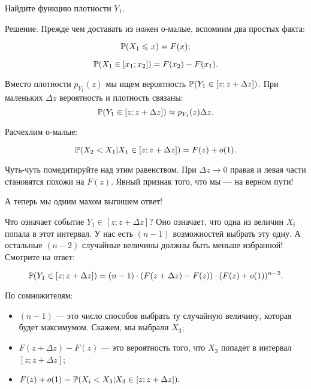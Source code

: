 \begin{myex} Найдите функцию плотности $ Y_{1} $.

Решение. Прежде чем доставать из ножен о-малые, вспомним два простых факта:

\begin{equation}
\P(X_{1}\leq x)=F(x);
\end{equation}

\begin{equation}
\P(X_{1}\in [x_{1};x_{2}])=F(x_{2})-F(x_{1}).
\end{equation}



Вместо плотности $ p_{Y_{1}}(z) $ мы ищем вероятность $ \P(Y_{1}\in [z;z+\Delta z]) $. При маленьких $ \Delta z $ вероятность и плотность связаны:
\begin{equation}
\P(Y_{1}\in [z;z+\Delta z])\approx p_{Y_{1}}(z)\Delta z.
\end{equation}


Расчехлим о-малые:

\begin{equation}
\P(X_{2}<X_{1}|X_{1}\in [z;z+\Delta z])=F(z)+o(1).
\end{equation}

Чуть-чуть помедитируйте над этим равенством. При $ \Delta z\to 0 $ правая и левая части становятся похожи на $ F(z) $. Явный признак того, что мы — на верном пути!

А теперь мы одним махом выпишем ответ!

Что означает событие $ Y_{1}\in [z;z+\Delta z] $? Оно означает, что одна из величин $ X_{i} $ попала в этот интервал. У нас есть $ (n-1) $ возможностей выбрать эту одну. А остальные $ (n-2) $ случайные величины должны быть меньше избранной! Смотрите на ответ:

\begin{equation}
\P(Y_{1}\in [z;z+\Delta z])=(n-1)\cdot (F(z+\Delta z)-F(z)) \cdot (F(z)+o(1))^{n-2}.
\end{equation}

По сомножителям:
\begin{itemize}
\item $ (n-1) $ — это число способов выбрать ту случайную величину, которая будет максимумом. Скажем, мы выбрали $ X_{3} $;
\item $ F(z+\Delta z)-F(z) $ — это вероятность того, что $ X_{3} $ попадет в интервал $ [z;z+\Delta z] $;
\item $ F(z)+o(1)=\P(X_{i}<X_{3}|X_{3}\in [z;z+\Delta z]).$
\end{itemize}


\end{myex}

